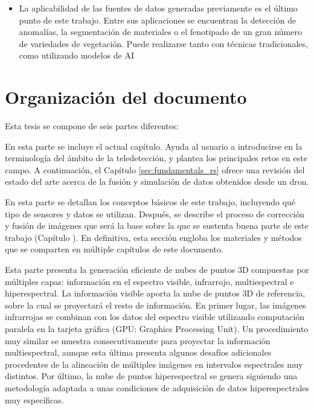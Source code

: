 \begin{itemize}
    \item La aplicabilidad de las fuentes de datos generadas previamente es el último punto de este trabajo. Entre sus aplicaciones se encuentran la detección de anomalías, la segmentación de materiales o el fenotipado de un gran número de variedades de vegetación. Puede realizarse tanto con técnicas tradicionales, como utilizando modelos de AI
\end{itemize}

\section{Organización del documento}

Esta tesis se compone de seis partes diferentes:

\small {} \normalsize\hspace{3mm} En esta parte se incluye el actual capítulo. Ayuda al usuario a introducirse en la terminología del ámbito de la teledetección, y plantea los principales retos en este campo. A continuación, el Capítulo \ref{sec:fundamentals_rs} ofrece una revisión del estado del arte acerca de la fusión y simulación de datos obtenidos desde un dron.

\small {} \normalsize\hspace{3mm} En esta parte se detallan los conceptos básicos de este trabajo, incluyendo qué tipo de sensores y datos se utilizan. Después, se describe el proceso de corrección y fusión de imágenes que será la base sobre la que se sustenta buena parte de este trabajo (Capítulo ). En definitiva, esta sección engloba los materiales y métodos que se comparten en múltiple capítulos de este documento.

\small {} \normalsize\hspace{3mm} Esta parte presenta la generación eficiente de nubes de puntos 3D compuestas por múltiples capas: información en el espectro visible, infrarrojo, multiespectral e hiperespectral. La información visible aporta la nube de puntos 3D de referencia, sobre la cual se proyectará el resto de información. En primer lugar, las imágenes infrarrojas se combinan con los datos del espectro visible utilizando computación paralela en la tarjeta gráfica (GPU: Graphics Processing Unit). Un procedimiento muy similar se muestra consecutivamente para proyectar la información multiespectral, aunque esta última presenta algunos desafíos adicionales procedentes de la alineación de múltiples imágenes en intervalos espectrales muy distintos. Por último, la nube de puntos hiperespectral se genera siguiendo una metodología adaptada a unas condiciones de adquisición de datos hiperespectrales muy específicas.

